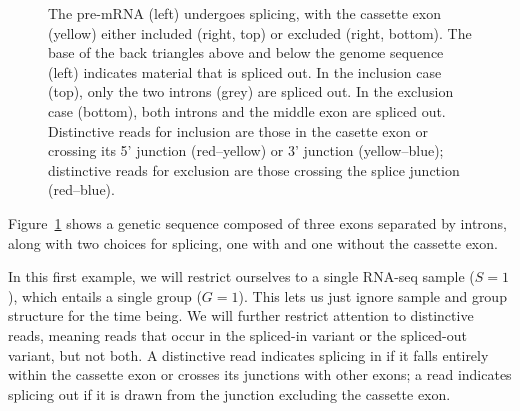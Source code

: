 \documentclass[11pt]{report}
\newcommand{\mycaption}[2]{\caption{#2}\label{#1}}
\begin{document}
\begin{figure}[t!]
  \centering
  \mycaption{fig:cassette-exon}{The pre-mRNA (left) undergoes
    splicing, with the cassette exon (yellow) either included (right,
    top) or excluded (right, bottom). The base of the back triangles
    above and below the genome sequence (left) indicates material that
    is spliced out. In the inclusion case (top), only the two introns
    (grey) are spliced out.  In the exclusion case (bottom), both
    introns and the middle exon are spliced out. Distinctive reads for
    inclusion are those in the casette exon or crossing its 5'
    junction (red--yellow) or 3' junction (yellow--blue); distinctive
    reads for exclusion are those crossing the splice junction (red--blue).}
\end{figure}

Figure~\ref{fig:cassette-exon} shows a genetic sequence composed of
three exons separated by introns, along with two choices for splicing,
one with and one without the cassette exon.

In this first example, we will restrict ourselves to a single RNA-seq
sample ($S = 1$), which entails a single group ($G = 1$). This lets us
just ignore sample and group structure for the time being. We will
further restrict attention to distinctive reads, meaning reads that
occur in the spliced-in variant or the spliced-out variant, but not
both. A distinctive read indicates splicing in if it falls entirely
within the cassette exon or crosses its junctions with other exons; a
read indicates splicing out if it is drawn from the junction excluding
the cassette exon.
\end{document}
